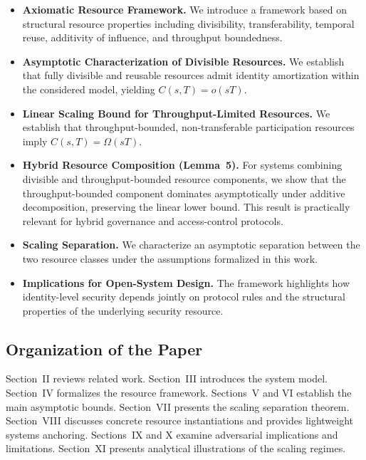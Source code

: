 \documentclass[journal]{IEEEtran}
\begin{document}
	\begin{itemize}
		
		\item \textbf{Axiomatic Resource Framework.}
		We introduce a framework based on structural resource
		properties including divisibility, transferability,
		temporal reuse, additivity of influence,
		and throughput boundedness.
		
		\item \textbf{Asymptotic Characterization of Divisible Resources.}
		We establish that fully divisible and reusable resources
		admit identity amortization within the considered model,
		yielding
		$C(s,T)=o(sT)$.
		
		\item \textbf{Linear Scaling Bound for Throughput-Limited Resources.}
		We establish that throughput-bounded,
		non-transferable participation resources imply
		$C(s,T)=\Omega(sT)$.
		
		\item \textbf{Hybrid Resource Composition (Lemma~5).}
		For systems combining divisible and throughput-bounded
		resource components, we show that the throughput-bounded
		component dominates asymptotically under additive
		decomposition, preserving the linear lower bound.
		This result is practically relevant for hybrid governance
		and access-control protocols.
		
		\item \textbf{Scaling Separation.}
		We characterize an asymptotic separation between the
		two resource classes under the assumptions formalized
		in this work.
		
		\item \textbf{Implications for Open-System Design.}
		The framework highlights how identity-level security
		depends jointly on protocol rules and the structural
		properties of the underlying security resource.
		
	\end{itemize}
	
	\subsection{Organization of the Paper}
	
	Section~II reviews related work.
	Section~III introduces the system model.
	Section~IV formalizes the resource framework.
	Sections~V and VI establish the main asymptotic bounds.
	Section~VII presents the scaling separation theorem.
	Section~VIII discusses concrete resource instantiations
	and provides lightweight systems anchoring.
	Sections~IX and X examine adversarial implications and
	limitations.
	Section~XI presents analytical illustrations of the
	scaling regimes.
\end{document}
